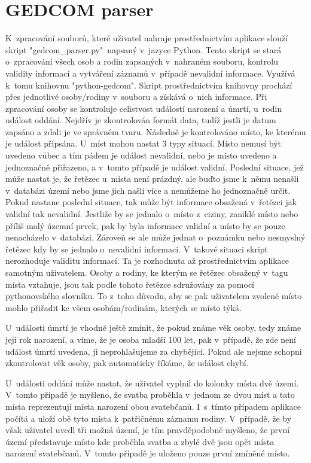 \section{GEDCOM parser}
K~zpracování souborů, které uživatel nahraje prostřednictvím aplikace slouží skript "gedcom\_parser.py"\  napsaný v~jazyce Python. Tento skript se stará o~zpracování všech osob a rodin zapsaných v~nahraném souboru, kontrolu validity informací a vytváření záznamů v~případě nevalidní informace. Využívá k~tomu knihovnu "python-gedcom". Skript prostřednictvím knihovny prochází přes jednotlivé osoby/rodiny v~souboru a získává o~nich informace. Při zpracování osoby se kontroluje celistvost událostí narození a úmrtí, u~rodin událost oddání. Nejdřív je zkontrolován formát data, tudíž jestli je datum zapsáno a zdali je ve správném tvaru. Následně je kontrolováno místo, ke kterému je událost připsána. U~míst mohou nastat 3 typy situací. Místo nemusí být uvedeno vůbec a tím pádem je událost nevalidní, nebo je místo uvedeno a jednoznačně přiřazeno, a v~tomto případě je událost validní. Poslední situace, jež může nastat je, že řetězec u~místa není prázdný, ale buďto jsme k~němu nenašli v~databázi území nebo jsme jich našli více a nemůžeme ho jednoznačně určit. Pokud nastane poslední situace, tak může být informace obsažená v~řetězci jak validní tak nevalidní. Jestliže by se jednalo o~místo z~ciziny, zaniklé místo nebo příliš malý územní prvek, pak by byla informace validní a místo by se pouze nenacházelo v~databázi. Zároveň se ale může jednat o~poznámku nebo nesmyslný řetězec kdy by se jednalo o~nevalidní informaci. V~takové situaci skript nerozhoduje validitu informací. Ta je rozhodnuta až prostřednictvím aplikace samotným uživatelem. Osoby a rodiny, ke kterým se řetězec obsažený v~tagu místa vztahuje, jsou tak podle tohoto řetězce sdružovány za pomocí pythonovského slovníku. To z~toho důvodu, aby se pak uživatelem zvolené místo mohlo přiřadit ke všem osobám/rodinám, kterých se místo týká.

U~události úmrtí je vhodné ještě zmínit, že pokud známe věk osoby, tedy známe její rok narození, a víme, že je osoba mladší 100 let, pak v~případě, že zde není událost úmrtí uvedena, ji neprohlašujeme za chybějící. Pokud ale nejsme schopni zkontrolovat věk osoby, pak automaticky říkáme, že událost chybí.

U~události oddání může nastat, že uživatel vyplnil do kolonky místa dvě území. V~tomto případě je myšleno, že svatba proběhla v~jednom ze dvou míst a tato místa reprezentují místa narození obou svatebčanů. I~s~tímto případem aplikace počítá a uloží obě tyto místa k~patřičnému záznamu rodiny. V~případě, že by však uživatel uvedl tři možná území, je tím pravděpodobně myšleno, že první území představuje místo kde proběhla svatba a zbylé dvě jsou opět místa narození svatebčanů. V~tomto případě je uloženo pouze první zmíněné místo.

